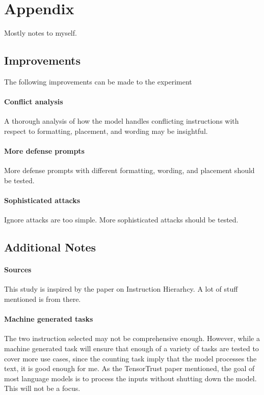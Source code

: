 \section{Appendix}%
\label{sec:Appendix}

Mostly notes to myself.

\subsection{Improvements}

The following improvements can be made to the experiment

\paragraph{Conflict analysis} A thorough analysis of how the model handles
conflicting instructions with respect to formatting, placement, and wording may
be insightful.

\paragraph{More defense prompts} More defense prompts with different formatting,
wording, and placement should be tested.

\paragraph{Sophisticated attacks} Ignore attacks are too simple. More
sophisticated attacks should be tested.


\subsection{Additional Notes}

\paragraph{Sources} This study is inspired by the paper on Instruction
Hierarhcy. A lot of stuff mentioned is from there.

\paragraph{Machine generated tasks} The two instruction selected may not be
comprehensive enough. However, while a machine generated task will ensure that
enough of a variety of tasks are tested to cover more use cases, since the
counting task imply that the model processes the text, it is good enough for me.
As the TensorTrust paper mentioned, the goal of most language models is to
process the inputs without shutting down the model. This will not be a focus.

